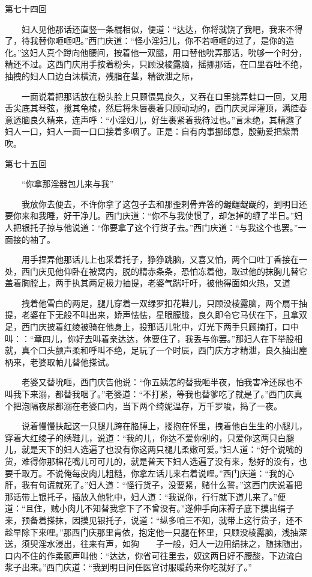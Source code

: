 第七十四回

　　妇人见他那话还直竖一条棍相似，便道：“达达，你将就饶了我吧，我来不得了，待我替你咂咂吧。”西门庆道：“怪小淫妇儿，你不若咂咂的过了，是你的造化。”这妇人真个蹲向他腰间，按着他一双腿，用口替他吮弄那话，吮够一个时分，精还不过。这西门庆用手按着粉头，只顾没棱露脑，摇挪那话，在口里吞吐不绝，抽拽的妇人口边白沫横流，残脂在茎，精欲泄之际，


　　一面说着把那话放在粉头脸上只顾偎晃良久，又吞在口里挑弄蛙口一回，又用舌尖底其琴弦，搅其龟棱，然后将朱唇裹着只顾动动的，西门庆灵犀灌顶，满腔春意透脑良久精来，连声呼：“小淫妇儿，好生裹紧着我待过也。”言未绝，其精邈了妇人一口，妇人一面一口口接着多咽了。正是：自有内事挪郎意，殷勤爱把紫萧吹。


第七十五回

　　“你拿那淫器包儿来与我”

　　我放你去便去，不许你拿了这包子去和那歪剌骨弄答的龌龌龊龊的，到明日还要你来和我睡，好干净儿。西门庆道：“你不与我使惯了，却怎掉的缠了半日。”妇人把银托子掠与他说道：“你要拿了这个行货子去。”西门庆道：“与我这个也罢。”一面接的袖了。


　　用手捏弄他那话儿上也采着托子，狰狰跳脑，又喜又怕，两个口吐丁香接在一处，西门庆见他仰卧在被窝内，脱的精赤条条，恐怕冻着他，取过他的抹胸儿替它盖着胸膛上，两手执其两足极力抽提，老婆气踹吁吁，被他得面如火热，又道

　　拽着他雪白的两足，腿儿穿着一双绿罗扣花鞋儿，只顾没棱露脑，两个扇干抽提，老婆在下无般不叫出来，娇声怯怯，星眼朦胧，良久即令它马伏在下，且拿双足，西门庆披着红绫被骑在他身上，投那话儿牝中，灯光下两手只顾摘打，口中叫：：“章四儿，你好去叫着亲达达，休要住了，我丢与你罢。”那妇人在下举股相就，真个口头颤声柔和呼叫不绝，足玩了一个时辰，西门庆方才精泄，良久抽出麈柄来，老婆取帕儿替他搽试。

　　老婆又替吮咂，西门庆告他说：“你五姨怎的替我咂半夜，怕我害冷还尿也不叫我下来溺，都替我咽了。”老婆道：“不打紧，等我也替爹吃了就是了。”西门庆真个把泡隔夜尿都溺在老婆口内，当下两个绮妮温存，万千罗唆，捣了一夜。


　　说着慢慢扶起这一只腿儿跨在胳膊上，搂抱在怀里，拽着他白生生的小腿儿，穿着大红绫子的绣鞋儿，说道：“我的儿，你达不爱你别的，只爱你这两只白腿儿，就是天下的妇人选遍了也没有你这两只褪儿柔嫩可爱。”妇人道：“好个说嘴的货，难得你那棉花嘴儿可可儿的，就是普天下妇人选遍了没有来，愁好的没有，也要千取万。不说俺每皮肉儿粗糙，你拿左话儿来右着说哩。”西门庆道：“我的心肝，我有句谎就死了。”妇人道：“怪行货子，没要紧，赌什么誓。”这西门庆说着把那话带上银托子，插放入他牝中，妇人道：“我说你，行行就下道儿来了。”便道：“且住，贼小肉儿不知替我拿下了不曾没有。”遂伸手向床褥子底下摸出绢子来，预备着搽抹，因摸见银托子，说道：“纵多咱三不知，就带上这行货子，还不趁早除下来哩。”那西门庆那里肯依，抱定他一只腿在怀里，只顾没棱露脑，浅抽深送，须臾淫水浸出，往来有声，如狗　　子一般，妇人一边用绢抹之，随抹随出，口内不住的作柔颤声叫他：“达达，你省可往里去，奴这两日好不腰酸，下边流白浆子出来。”西门庆道：“我到明日问任医官讨服暖药来你吃就好了。”


